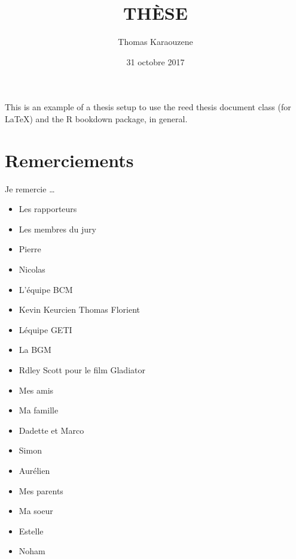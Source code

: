 \documentclass[12pt,twoside]{reedthesis}
\title{THÈSE}
\author{Thomas Karaouzene}
\date{31 octobre 2017}
\theoremstyle{definition}
\theoremstyle{definition}
\theoremstyle{remark}
\begin{document}
      \maketitle
  
  \frontmatter %
  \pagestyle{empty} %

  
      \begin{preface}
      This is an example of a thesis setup to use the reed thesis document
      class (for LaTeX) and the R bookdown package, in general.
    \end{preface}
  
      \hypersetup{linkcolor=black}
    \setcounter{tocdepth}{3}
    \tableofcontents
  
      \listoftables
  
      \listoffigures
  
  
  
  \mainmatter %
  \pagestyle{fancyplain} %

  \chapter*{Remerciements}\label{remerciements}
  
  Je remercie \ldots{}
  
  \begin{itemize}
  \item
    Les rapporteurs
  \item
    Les membres du jury\\
  \item
    Pierre\\
  \item
    Nicolas\\
  \item
    L'équipe BCM\\
  \item
    Kevin Keurcien Thomas Florient\\
  \item
    Léquipe GETI\\
  \item
    La BGM
  \item
    Rdley Scott pour le film Gladiator
  \item
    Mes amis\\
  \item
    Ma famille
  \item
    Dadette et Marco\\
  \item
    Simon\\
  \item
    Aurélien
  \item
    Mes parents\\
  \item
    Ma soeur
  \item
    Estelle\\
  \item
    Noham
  \end{itemize}
  
\end{document}
